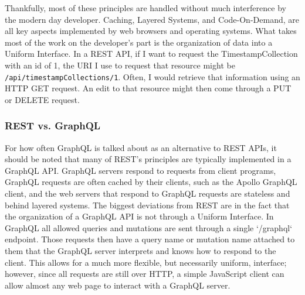 Thankfully, most of these principles are handled without much interference by the modern day developer. Caching, Layered Systems, and Code-On-Demand, are all key aspects implemented by web browsers and operating systems.  What takes most of the work on the developer's part is the organization of data into a Uniform Interface. In a REST API, if I want to request the TimestampCollection with an id of 1, the URI I use to request that resource might be \Verb"/api/timestampCollections/1".  Often, I would retrieve that information using an HTTP GET request.  An edit to that resource might then come through a PUT or DELETE request.

\subsubsection{REST vs. GraphQL}
For how often GraphQL is talked about as an alternative to REST APIs, it should be noted that many of REST's principles are typically implemented in a GraphQL API.  GraphQL servers respond to requests from client programs, GraphQL requests are often cached by their clients, such as the Apollo GraphQL client, and the web servers that respond to GraphQL requests are stateless and behind layered systems.  The biggest deviations from REST are in the fact that the organization of a GraphQL API is not through a Uniform Interface. In GraphQL all allowed queries and mutations are sent through a single `/graphql` endpoint.  Those requests then have a query name or mutation name attached to them that the GraphQL server interprets and knows how to respond to the client.  This allows for a much more flexible, but necessarily uniform, interface; however, since all requests are still over HTTP, a simple JavaScript client can allow almost any web page to interact with a GraphQL server.